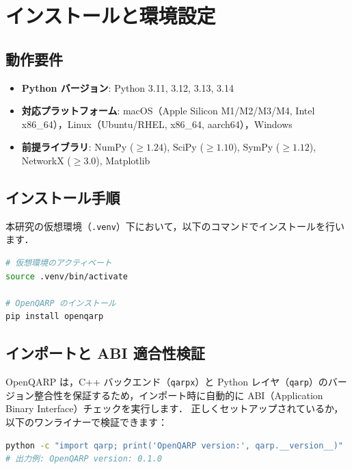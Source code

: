 \documentclass[11pt,a4paper]{ltjsarticle}
\begin{document}
\section{インストールと環境設定}

\subsection{動作要件}
\begin{itemize}\setlength{\itemsep}{1mm}
    \item \textbf{Python バージョン}: Python 3.11, 3.12, 3.13, 3.14
    \item \textbf{対応プラットフォーム}: macOS（Apple Silicon M1/M2/M3/M4, Intel x86\_64），Linux（Ubuntu/RHEL, x86\_64, aarch64），Windows
    \item \textbf{前提ライブラリ}: NumPy ($\ge 1.24$), SciPy ($\ge 1.10$), SymPy ($\ge 1.12$), NetworkX ($\ge 3.0$), Matplotlib
\end{itemize}

\subsection{インストール手順}
本研究の仮想環境（\texttt{.venv}）下において，以下のコマンドでインストールを行います．

\begin{lstlisting}[language=bash]
# 仮想環境のアクティベート
source .venv/bin/activate

# OpenQARP のインストール
pip install openqarp
\end{lstlisting}

\subsection{インポートと ABI 適合性検証}
OpenQARP は，C++ バックエンド（\texttt{qarpx}）と Python レイヤ（\texttt{qarp}）のバージョン整合性を保証するため，インポート時に自動的に ABI（Application Binary Interface）チェックを実行します．
正しくセットアップされているか，以下のワンライナーで検証できます：

\begin{lstlisting}[language=bash]
python -c "import qarp; print('OpenQARP version:', qarp.__version__)"
# 出力例: OpenQARP version: 0.1.0
\end{lstlisting}
\end{document}
